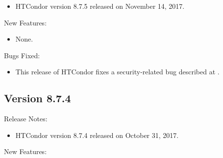 \begin{itemize}

\item HTCondor version 8.7.5 released on November 14, 2017.

\end{itemize}


\noindent New Features:

\begin{itemize}

\item None.

\end{itemize}

\noindent Bugs Fixed:

\begin{itemize}

\item \Security
This release of HTCondor fixes a security-related bug described at 
.

\end{itemize}

\subsection*{\label{sec:New-8-7-4}Version 8.7.4}

\noindent Release Notes:

\begin{itemize}

\item HTCondor version 8.7.4 released on October 31, 2017.

\end{itemize}


\noindent New Features:

